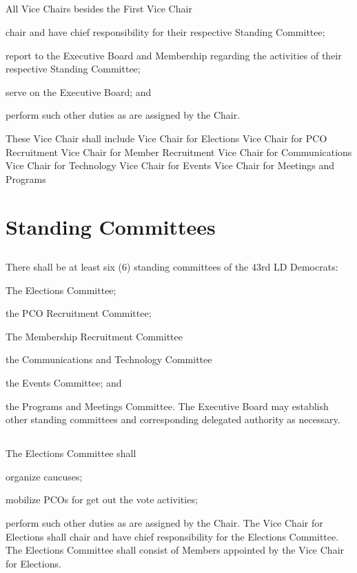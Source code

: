 \subsection{}
All Vice Chairs besides the First Vice Chair
\begin{inlinealphalist}
    \item chair and have chief responsibility for their respective Standing Committee;
    \item report to the Executive Board and Membership regarding the activities of their respective Standing Committee;
    \item serve on the Executive Board; and
    \item perform such other duties as are assigned by the Chair.
\end{inlinealphalist}

These Vice Chair shall include
Vice Chair for Elections
Vice Chair for PCO Recruitment
Vice Chair for Member Recruitment
Vice Chair for Communications
Vice Chair for Technology
Vice Chair for Events
Vice Chair for Meetings and Programs

\section{Standing Committees}
\subsection{} \label{standing-committee-list}
There shall be at least six (6) standing committees of the 43rd LD Democrats:
\begin{inlinealphalist}
    \item The Elections Committee;
    \item the PCO Recruitment Committee;
    \item The Membership Recruitment Committee
    \item the Communications and Technology Committee
    \item the Events Committee; and
    \item the Programs and Meetings Committee. The Executive Board may establish other standing committees and corresponding delegated authority as necessary.
\end{inlinealphalist}

\subsection{} \label{elections-committee}
The Elections Committee shall
\begin{inlinealphalist}
    \item organize caucuses;
    \item mobilize PCOs for get out the vote activities;
    \item perform such other duties as are assigned by the Chair. The Vice Chair for Elections shall chair and have chief responsibility for the Elections Committee. The Elections Committee shall consist of Members appointed by the Vice Chair for Elections.
\end{inlinealphalist}

